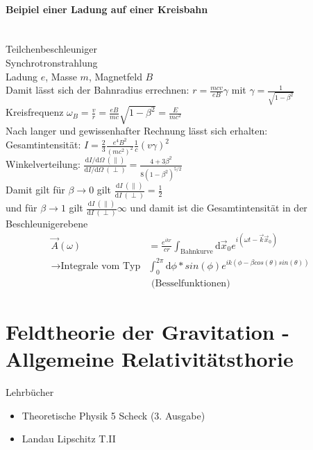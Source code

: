 \documentclass[a4paper]{article}
\begin{document}
\paragraph{Beipiel einer Ladung auf einer Kreisbahn}\\
Teilchenbeschleuniger\\
Synchrotronstrahlung\\
Ladung $e$, Masse $m$, Magnetfeld $B$\\
Damit lässt sich der Bahnradius errechnen: $r=\frac{mcv}{eB}\gamma$ mit
$\gamma=\frac{1}{\sqrt{1-\beta^2}}$\\
Kreisfrequenz
$\omega_B=\frac{v}{r}=\frac{eB}{mc}\sqrt{1-\beta^2}=\frac{E}{mc^2}$\\
Nach langer und gewissenhafter Rechnung lässt sich erhalten:\\
Gesamtintensität: 
$I=\frac{2}{3}\frac{e^4B^2}{(mc^2)^2}\frac{1}{c}\left(v\gamma\right)^2$\\
Winkelverteilung: $\frac{\mathrm{d}I/\mathrm{d}\Omega\
(\parallel)}{\mathrm{d}I/\mathrm{d}\Omega\
(\perp)}=\frac{4+3\beta^2}{8(1-\beta^2)^{5/2}}$\\
Damit gilt für $\beta\rightarrow0$ gilt $\frac{\mathrm{d}I\
(\parallel)}{\mathrm{d}I \ (\perp)}=\frac{1}{2}$\\
und für $\beta\rightarrow1$ gilt $\frac{\mathrm{d}I\
(\parallel)}{\mathrm{d}I \ (\perp)}\infty$ und damit ist die Gesamtintensität in
der Beschleunigerebene
\begin{align}
\vec{A}(\omega)&=\frac{e^{ikr}}{cr}\int_{\text{Bahnkurve}}\mathrm{d}\vec{x}_0
e^{i(\omega t-\vec{k}\vec{x}_0)}\\
\rightarrow \text{Integrale vom Typ} &\int_0^{2\pi}\mathrm{d}\phi*sin(\phi)
e^{ik(\phi-\beta cos(\theta)sin(\theta))}\\&\text{  (Besselfunktionen)}
\end{align}

\section{Feldtheorie der Gravitation - Allgemeine Relativitätsthorie}
Lehrbücher
\begin{itemize}
  \item Theoretische Physik 5 Scheck (3. Ausgabe)
  \item Landau Lipschitz T.II 
\end{itemize}
\end{document}
